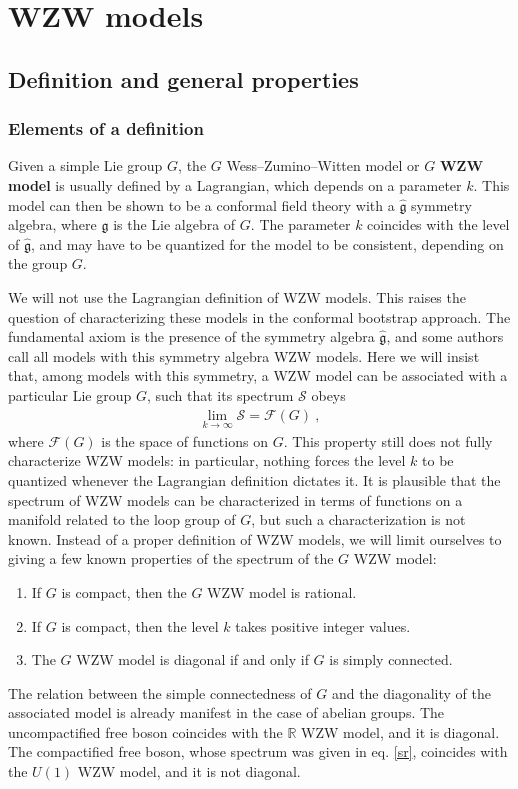 \documentclass[12pt, a4paper, notitlepage, twoside]{report}
\numberwithin{equation}{section}
\theoremstyle{break}
\begin{document}
\section{WZW models}

\subsection{Definition and general properties}

\subsubsection{Elements of a definition}

Given a simple Lie group $G$, the $G$ Wess--Zumino--Witten model or $G$ \textbf{\boldmath WZW model} is usually defined by a Lagrangian, which depends on a parameter $k$.
This model can then be shown to be a conformal field theory with a $\hat{\mathfrak{g}}$ symmetry algebra, where $\mathfrak{g}$ is the Lie algebra of $G$.
The parameter $k$ coincides with the level of $\hat{\mathfrak{g}}$, and may have to be quantized for the model to be consistent, depending on the group $G$.

We will not use the Lagrangian definition of WZW models.
This raises the question of characterizing these models in the conformal bootstrap approach.
The fundamental axiom is the presence of the symmetry algebra $\hat{\mathfrak{g}}$, and some  authors call all models with this symmetry algebra WZW models.
Here we will insist that, among models with this symmetry, 
a WZW model can be associated with a particular Lie group $G$, such that its spectrum $\mathcal{S}$ obeys
\begin{align}
 \boxed{\underset{k\to \infty}{\lim} \mathcal{S} = \mathcal{F}(G)}\ ,
\label{lsfg}
\end{align}
where $\mathcal{F}(G)$ is the space of functions on $G$.
This property still does not fully characterize WZW models: in particular, nothing forces the level $k$ to be quantized whenever the Lagrangian definition dictates it.
It is plausible that the spectrum of WZW models can be characterized in terms of functions on a manifold related to the loop group of $G$, but such a characterization is not known.
Instead of a proper definition of WZW models, we will limit ourselves to giving a few known properties of the spectrum of the $G$ WZW model:
\begin{enumerate}
 \item If $G$ is compact, then the $G$ WZW model is rational.
\item If $G$ is compact, then the level $k$ takes positive integer values.
\item The $G$ WZW model is diagonal if and only if $G$ is simply connected. 
\end{enumerate}
The relation between the simple connectedness of $G$ and the diagonality of the associated model is already manifest in the case of abelian groups.
The uncompactified free boson coincides with the ${\mathbb{R}}$ WZW model, and it is diagonal.
The compactified free boson, whose spectrum was given in eq. \eqref{sr}, coincides with the $U(1)$ WZW model, and it is not diagonal. 
\end{document}
